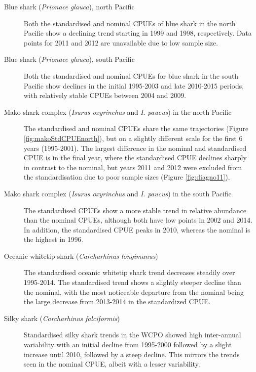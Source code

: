 \begin{description}
\item[Blue shark (\emph{Prionace glauca}), north Pacific] Both the standardised and nominal CPUEs of blue shark in the north Pacific show a declining trend starting in 1999 and 1998, respectively. Data points for 2011 and 2012 are unavailable due to low sample size.  
 
 \item[Blue shark (\emph{Prionace glauca}), south Pacific]  
 Both the standardised and nominal CPUEs for blue shark in the south Pacific show declines in the initial 1995-2003 and late 2010-2015 periods, with relatively stable CPUEs between 2004  and 2009.  
 
 \item[Mako shark complex (\emph{Isurus oxyrinchus} and \emph{I. paucus}) in the north Pacific] 
 The standardised and nominal CPUEs share the same trajectories (Figure \ref{fig:makoStdCPUEnorth}), but on a slightly different scale for the first 6 years (1995-2001).  The largest difference in the nominal and standardised CPUE is in the final year, where the standardised CPUE declines sharply in contrast to the nominal, but years 2011 and 2012 were excluded from the standardisation due to poor sample sizes (Figure \ref{fig:diagno11}).
 
\item[Mako shark complex (\emph{Isurus oxyrinchus} and \emph{I. paucus}) in the south Pacific] 
The standardised CPUEs show a more stable trend in relative abundance than the nominal CPUEs, although both have low points in 2002 and 2014. In addition, the standardised CPUE peaks in 2010, whereas the nominal is the highest in 1996.
 
\item[Oceanic whitetip shark (\emph{Carcharhinus longimanus})] 
The standardised oceanic whitetip shark trend decreases steadily over 1995-2014.  The standardised trend shows a slightly steeper decline than the nominal, with the most noticeable departure from the nominal being the large decrease from 2013-2014 in the standardized CPUE.%
 
 \item[Silky shark (\emph{Carcharhinus falciformis})] 
 Standardised silky shark trends in the WCPO showed high inter-annual variability with an initial decline from 1995-2000 followed by a slight increase until 2010, followed by a steep decline. This mirrors the trends seen in the nominal CPUE, albeit with a lesser variability.
 

\end{description}
